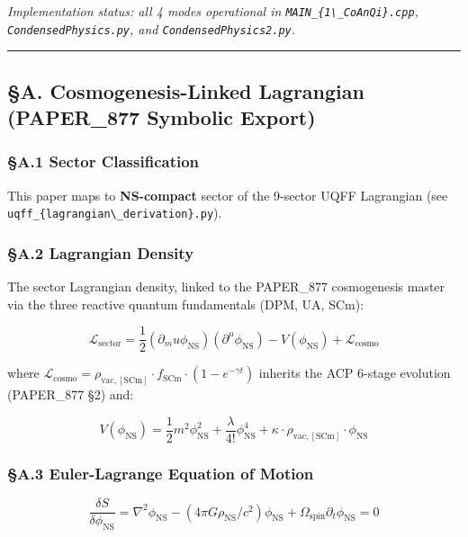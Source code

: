 \documentclass[
  11pt,
]{article}
\begin{document}
\emph{Implementation status: all 4 modes operational in
\texttt{MAIN\_\{1\textbackslash{}\_CoAnQi\}.cpp},
\texttt{CondensedPhysics.py}, and \texttt{CondensedPhysics2.py}.}

\begin{center}\rule{0.5\linewidth}{0.5pt}\end{center}

\subsection{§A. Cosmogenesis-Linked Lagrangian (PAPER\_877 Symbolic
Export)}\label{a.-cosmogenesis-linked-lagrangian-paper_877-symbolic-export}

\subsubsection{§A.1 Sector
Classification}\label{a.1-sector-classification}

This paper maps to \textbf{NS-compact} sector of the 9-sector UQFF
Lagrangian (see
\texttt{uqff\_\{lagrangian\textbackslash{}\_derivation\}.py}).

\subsubsection{§A.2 Lagrangian Density}\label{a.2-lagrangian-density}

The sector Lagrangian density, linked to the PAPER\_877 cosmogenesis
master via the three reactive quantum fundamentals (DPM, UA, SCm):

\[\mathcal{L}_{\mathrm{sector}} = \frac{1}{2}(\partial_mu \phi_{\mathrm{NS}})(\partial^\mu \phi_{\mathrm{NS}}) - V(\phi_{\mathrm{NS}}) + \mathcal{L}_{\mathrm{cosmo}}\]

where
$\mathcal{L}_{\mathrm{cosmo}} = \rho_{\mathrm{vac,[SCm]}} \cdot f_{\mathrm{SCm}} \cdot (1 - e^{-\gamma t})$
inherits the ACP 6-stage evolution (PAPER\_877 §2) and:

\[V(\phi_{\mathrm{NS}}) = \frac{1}{2} m^2 \phi_{\mathrm{NS}}^2 + \frac{\lambda}{4!} \phi_{\mathrm{NS}}^4 + \kappa \cdot \rho_{\mathrm{vac,[SCm]}} \cdot \phi_{\mathrm{NS}}\]

\subsubsection{§A.3 Euler-Lagrange Equation of
Motion}\label{a.3-euler-lagrange-equation-of-motion}

\[\boxed{\frac{\delta S}{\delta \phi_{\mathrm{NS}}} = \nabla^2 \phi_{\mathrm{NS}} - (4\pi G \rho_{\mathrm{NS}}/c^2)\phi_{\mathrm{NS}} + \Omega_{\mathrm{spin}} \partial_t \phi_{\mathrm{NS}} = 0}\]
\end{document}
